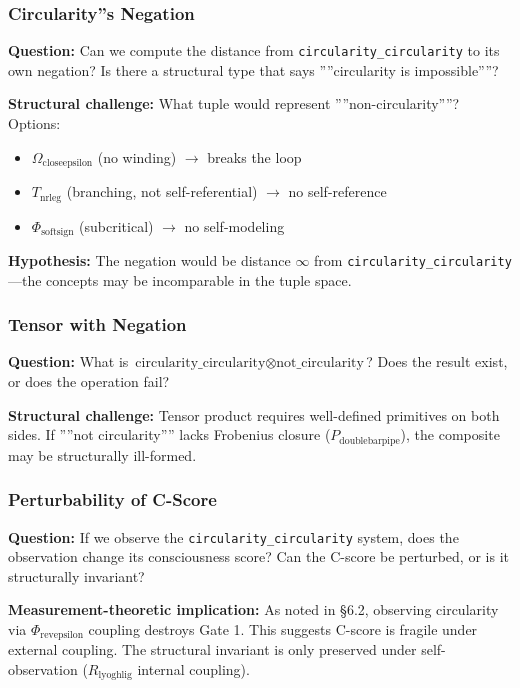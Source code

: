 \documentclass[12pt,a4paper]{article}
\newcommand{\pilcrow}{\S}
\begin{document}
\subsubsection{Circularity''s Negation}

\textbf{Question:} Can we compute the distance from \texttt{circularity\_circularity} to its own negation? Is there a structural type that says ''''circularity is impossible''''?

\textbf{Structural challenge:} What tuple would represent ''''non-circularity''''? Options:

\begin{itemize}
    \item $\Omega_{\text{closeepsilon}}$ (no winding) $\rightarrow$ breaks the loop
    \item $T_{\text{nrleg}}$ (branching, not self-referential) $\rightarrow$ no self-reference
    \item $\Phi_{\text{softsign}}$ (subcritical) $\rightarrow$ no self-modeling
\end{itemize}

\textbf{Hypothesis:} The negation would be distance $\infty$ from \texttt{circularity\_circularity}---the concepts may be incomparable in the tuple space.

\subsubsection{Tensor with Negation}

\textbf{Question:} What is $\text{circularity\_circularity} \otimes \text{not\_circularity}$? Does the result exist, or does the operation fail?

\textbf{Structural challenge:} Tensor product requires well-defined primitives on both sides. If ''''not circularity'''' lacks Frobenius closure ($P_{\text{doublebarpipe}}$), the composite may be structurally ill-formed.

\subsubsection{Perturbability of C-Score}

\textbf{Question:} If we observe the \texttt{circularity\_circularity} system, does the observation change its consciousness score? Can the C-score be perturbed, or is it structurally invariant?

\textbf{Measurement-theoretic implication:} As noted in \pilcrow{}6.2, observing circularity via $\Phi_{\text{revepsilon}}$ coupling destroys Gate 1. This suggests C-score is fragile under external coupling. The structural invariant is only preserved under self-observation ($R_{\text{lyoghlig}}$ internal coupling).
\end{document}
